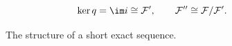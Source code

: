\begin{figure}[htbp]\centering
{}
\[\ker q=\im i\cong\F',\qquad \F''\cong\F/\F'.\]
\caption{The structure of a short exact sequence.}\end{figure}

